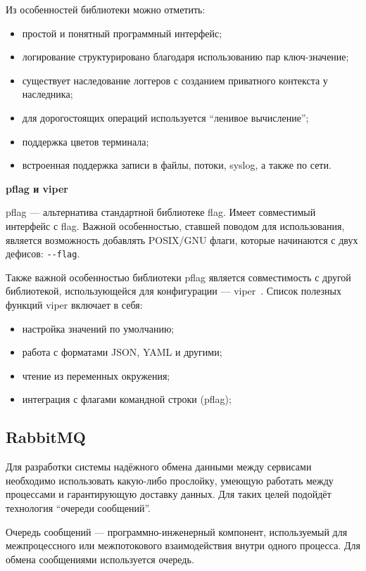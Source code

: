 Из особенностей библиотеки можно отметить:
\begin{itemize}
    \item простой и понятный программный интерфейс;
    \item логирование структурировано благодаря использованию пар ключ-значение;
    \item существует наследование логгеров с созданием приватного контекста у наследника;
    \item для дорогостоящих операций используется ``ленивое вычисление'';
    \item поддержка цветов терминала;
    \item встроенная поддержка записи в файлы, потоки, syslog, а также по сети.
\end{itemize}

\textbf{pflag и viper}

pflag — альтернатива стандартной библиотеке flag. Имеет совместимый интерфейс с flag. Важной особенностью, ставшей поводом для использования, является возможность добавлять POSIX/GNU флаги, которые начинаются с двух дефисов: \lstinline{--flag}.

Также важной особенностью библиотеки pflag является совместимость с другой библиотекой, использующейся для конфигурации — viper~\cite{viper}. Список полезных функций viper включает в себя:
\begin{itemize}
    \item настройка значений по умолчанию;
    \item работа с форматами JSON, YAML и другими;
    \item чтение из переменных окружения;
    \item интеграция с флагами командной строки (pflag);
\end{itemize}

\subsection{RabbitMQ}

Для разработки системы надёжного обмена данными между сервисами необходимо использовать какую-либо прослойку, умеющую работать между процессами и гарантирующую доставку данных. Для таких целей подойдёт технология ``очереди сообщений''.

Очередь сообщений — программно-инженерный компонент, используемый для межпроцессного или межпотокового взаимодействия внутри одного процесса. Для обмена сообщениями используется очередь.

